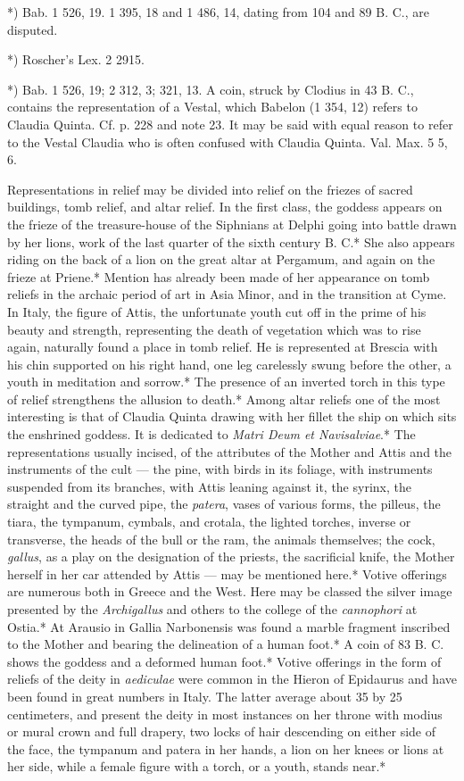 \documentclass[a4paper, 11pt, oneside, polutonikogreek, english]{article}
\begin{document}
*) Bab. 1 526, 19. 1 395, 18 and 1 486, 14, dating from 104 and 89 B. C., are disputed.

*) Roscher's Lex. 2 2915.

*) Bab. 1 526, 19; 2 312, 3; 321, 13. A coin, struck by Clodius in 43 B. C., contains the representation of a Vestal, which Babelon (1 354, 12) refers to Claudia Quinta. Cf. p. 228 and note 23. It may be said with equal reason to refer to the Vestal Claudia who is often confused with Claudia Quinta. Val. Max. 5 5, 6.

Representations in relief may be divided into relief on the friezes of sacred buildings, tomb relief, and altar relief. In the first class, the goddess appears on the frieze of the treasure-house of the Siphnians at Delphi going into battle drawn by her lions, work of the last quarter of the sixth century B. C.* She also appears riding on the back of a lion on the great altar at Pergamum, and again on the frieze at Priene.* Mention has already been made of her appearance on tomb reliefs in the archaic period of art in Asia Minor, and in the transition at Cyme. In Italy, the figure of Attis, the unfortunate youth cut off in the prime of his beauty and strength, representing the death of vegetation which was to rise again, naturally found a place in tomb relief. He is represented at Brescia with his chin supported on his right hand, one leg carelessly swung before the other, a youth in meditation and sorrow.* The presence of an inverted torch in this type of relief strengthens the allusion to death.* Among altar reliefs one of the most interesting is that of Claudia Quinta drawing with her fillet the ship on which sits the enshrined goddess. It is dedicated to \emph{Matri Deum et Navisalviae}.* The representations usually incised, of the attributes of the Mother and Attis and the instruments of the cult --- the pine, with birds in its foliage, with instruments suspended from its branches, with Attis leaning against it, the syrinx, the straight and the curved pipe, the \emph{patera}, vases of various forms, the pilleus, the tiara, the tympanum, cymbals, and crotala, the lighted torches, inverse or transverse, the heads of the bull or the ram, the animals themselves; the cock, \emph{gallus}, as a play on the designation of the priests, the sacrificial knife, the Mother herself in her car attended by Attis --- may be mentioned here.* Votive offerings are numerous both in Greece and the West. Here may be classed the silver image presented by the \emph{Archigallus} and others to the college of the \emph{cannophori} at Ostia.* At Arausio in Gallia Narbonensis was found a marble fragment inscribed to the Mother and bearing the delineation of a human foot.* A coin of 83 B. C. shows the goddess and a deformed human foot.* Votive offerings in the form of reliefs of the deity in \emph{aediculae} were common in the Hieron of Epidaurus and have been found in great numbers in Italy. The latter average about 35 by 25 centimeters, and present the deity in most instances on her throne with modius or mural crown and full drapery, two locks of hair descending on either side of the face, the tympanum and patera in her hands, a lion on her knees or lions at her side, while a female figure with a torch, or a youth, stands near.*
\end{document}
